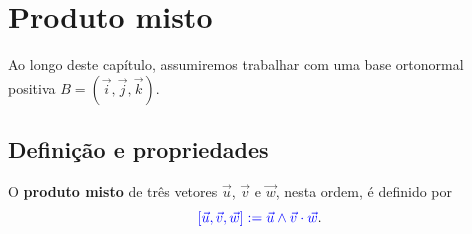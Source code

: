 
\chapter{Produto misto}\label{cap_prodmisto}
\thispagestyle{fancy}

Ao longo deste capítulo, assumiremos trabalhar com uma base ortonormal positiva $B = (\vec{i},\vec{j},\vec{k})$.

\section{Definição e propriedades}\label{cap_prodmisto_sec_defn}

O {\bf produto misto} de três vetores $\vec{u}$, $\vec{v}$ e $\vec{w}$, nesta ordem, é definido por
\begin{equation}
  {\color{blue}[\vec{u},\vec{v},\vec{w}] := \vec{u}\land\vec{v}\cdot\vec{w}}.
\end{equation}

